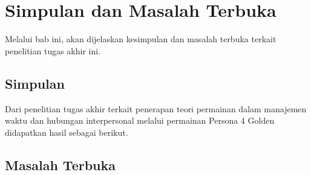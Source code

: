 \chapter{Simpulan dan Masalah Terbuka}
Melalui bab ini, akan dijelaskan kesimpulan dan masalah terbuka terkait penelitian tugas akhir ini.

\section{Simpulan}
Dari penelitian tugas akhir terkait penerapan teori permainan dalam manajemen waktu dan hubungan interpersonal melalui permainan Persona 4 Golden didapatkan hasil sebagai berikut.

\section{Masalah Terbuka}


